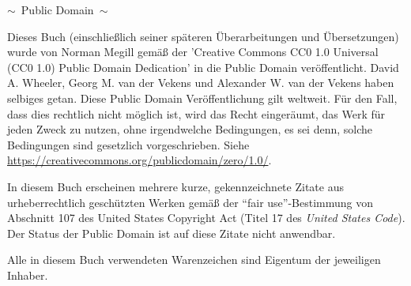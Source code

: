 \begin{center}
$\sim$\ {\sc Public Domain}\ $\sim$

\vspace{2ex}
Dieses Buch (einschließlich seiner späteren Überarbeitungen und Übersetzungen) wurde von Norman Megill gemäß der 'Creative Commons CC0 1.0 Universal (CC0 1.0) Public Domain Dedication' in die Public Domain veröffentlicht. 
David A. Wheeler, Georg M. van der Vekens und Alexander W. van der Vekens haben selbiges getan. Diese Public Domain Veröffentlichung gilt weltweit. Für den Fall, dass dies rechtlich nicht möglich ist, wird das Recht eingeräumt, das Werk für jeden Zweck zu nutzen, ohne irgendwelche Bedingungen, es sei denn, solche Bedingungen sind gesetzlich vorgeschrieben.
Siehe \url{https://creativecommons.org/publicdomain/zero/1.0/}.

\vspace{3ex}
In diesem Buch erscheinen mehrere kurze, gekennzeichnete Zitate aus urheberrechtlich geschützten Werken gemäß der "`fair use"'-Bestimmung von Abschnitt 107 des United States Copyright Act (Titel 17 des {\em United States Code}). Der Status der Public Domain ist auf diese Zitate nicht anwendbar.

\vspace{3ex}
Alle in diesem Buch verwendeten Warenzeichen sind Eigentum der jeweiligen Inhaber.


%
%
%
%


\end{center}
